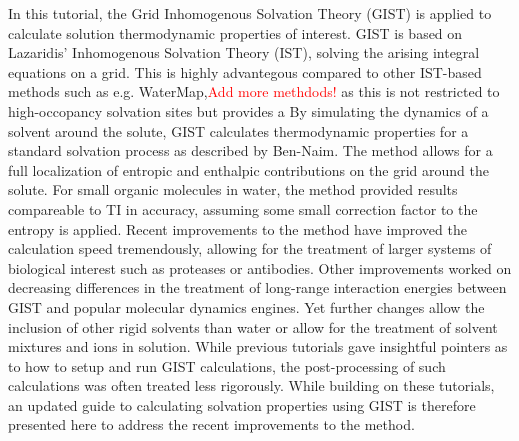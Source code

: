 \documentclass[9pt,tutorial]{livecoms}
\newcommand{\todo}{\textcolor{red}}
\begin{document}
In this tutorial, the Grid Inhomogenous Solvation Theory (GIST) is applied to calculate solution thermodynamic properties of interest. 
GIST is based on Lazaridis' Inhomogenous Solvation Theory (IST), solving the arising integral equations on a grid. 
This is highly advantegous compared to other IST-based methods such as e.g. WaterMap,\todo{Add more methdods!} as this is not restricted to high-occopancy solvation sites but provides a 
By simulating the dynamics of a solvent around the solute, GIST calculates thermodynamic properties for a standard solvation process as described by Ben-Naim.
The method allows for a full localization of entropic and enthalpic contributions on the grid around the solute.
For small organic molecules in water, the method provided results compareable to TI in accuracy, assuming some small correction factor to the entropy is applied. 
Recent improvements to the method have improved the calculation speed tremendously, allowing for the treatment of larger systems of biological interest such as proteases or antibodies. 
Other improvements worked on decreasing differences in the treatment of long-range interaction energies between GIST and popular molecular dynamics engines. 
Yet further changes allow the inclusion of other rigid solvents than water or allow for the treatment of solvent mixtures and ions in solution. 
While previous tutorials gave insightful pointers as to how to setup and run GIST calculations, the post-processing of such calculations was often treated less rigorously. While building on these tutorials, an updated guide to calculating solvation properties using GIST is therefore presented here to address the recent improvements to the method.

%
%
%
\end{document}
